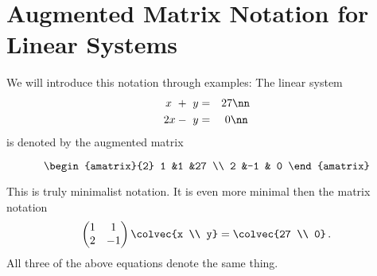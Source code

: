 \section{Augmented Matrix Notation for Linear Systems}

We will introduce this notation through examples: 
The linear system 
\begin{eqnarray}
	x\ +\ y & = & 27\nn \\
	2x-\ y & = &\  0\nn \,
\end{eqnarray}
is denoted by the augmented matrix

\[
\begin{amatrix}{2}
1 &1 &27 \\ 2 &-1 & 0
\end{amatrix}
\]

\noindent
This is truly minimalist notation. It is even more minimal then the matrix notation  
\begin{equation*}
    \begin{pmatrix}
      1             &1  \\
      2             &-1
    \end{pmatrix}
  \colvec{x \\ y}
  =
  \colvec{27 \\ 0}\, .
\end{equation*}
All three of the above equations denote the same thing. 




